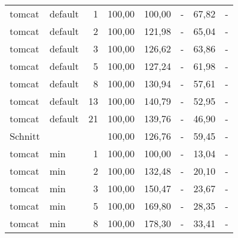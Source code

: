 \begin{footnotesize}
\begin{longtable}{llrrrrrr}
		tomcat         & default & 1          & 100,00 & \cellcolor[HTML]{C0C0C0}100,00 & -                           & 67,82                       & -                           \\
		tomcat         & default & 2          & 100,00 & 121,98                      & -                           & 65,04                       & -                           \\
		tomcat         & default & 3          & 100,00 & 126,62                      & -                           & 63,86                       & -                           \\
		tomcat         & default & 5          & 100,00 & 127,24                      & -                           & 61,98                       & -                           \\
		tomcat         & default & 8          & 100,00 & 130,94                      & -                           & 57,61                       & -                           \\
		tomcat         & default & 13         & 100,00 & 140,79                      & -                           & 52,95                       & -                           \\
		tomcat         & default & 21         & 100,00 & 139,76                      & -                           & 46,90                       & -                           \\ \hline
		Schnitt        &         &            & 100,00 & 126,76                      & -                           & 59,45                       & -                           \\ \hline
		tomcat         & min     & 1          & 100,00 & \cellcolor[HTML]{C0C0C0}100,00 & -                           & 13,04                       & -                           \\
		tomcat         & min     & 2          & 100,00 & 132,48                      & -                           & 20,10                       & -                           \\
		tomcat         & min     & 3          & 100,00 & 150,47                      & -                           & 23,67                       & -                           \\
		tomcat         & min     & 5          & 100,00 & 169,80                      & -                           & 28,35                       & -                           \\
		tomcat         & min     & 8          & 100,00 & 178,30                      & -                           & 33,41                       & -                           \\

\end{longtable}
\end{footnotesize}
